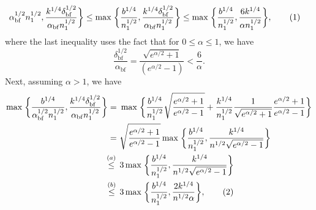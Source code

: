 \documentclass[twoside,11pt]{article}
\newcommand\numberthis{\addtocounter{equation}{1}\tag{\theequation}}
\newcommand{\normSqMultinomMax}{b}
\newcommand{\alphabetSize}{k} %
\newcommand{\sampleSize}{n}
\newcommand{\privacyParameter}{\alpha} %
\newcommand{\privacyParameterrappor}{\privacyParameter_{\mathrm{bf}}}
\newcommand{\smallNumber}{\delta}
\newcommand{\smallNumberrappor}{\smallNumber_{\mathrm{bf}}}
\begin{document}
\begin{appendix}
\begin{align*}
{		}{
			\privacyParameterrappor^{1/2}
			\sampleSize_1^{1/2}}
		,
		\frac{
			\alphabetSize^{1/4}
			\smallNumberrappor^{1/2} 
		}{
			\privacyParameterrappor
			\sampleSize_1^{1/2}}
		\biggr\}
		&\leq
		\max \;
		\biggl\{
		\frac{
			\normSqMultinomMax^{1/4}
		}{
			\sampleSize_1^{1/2}}
		,
		\frac{
			\alphabetSize^{1/4}
			\smallNumberrappor^{1/2} 
		}{
			\privacyParameterrappor
			\sampleSize_1^{1/2}}
		\biggr\}
		\leq
		\max \;
		\biggl\{
		\frac{
			\normSqMultinomMax^{1/4}
		}{
			\sampleSize_1^{1/2}}
		,
		\frac{
			6\alphabetSize^{1/4}
		}{
			\privacyParameter
			\sampleSize_1^{1/2}}
		\biggr\},
		\numberthis
		\label{rappor_final_high_privacy}
	\end{align*}
	where the last inequality uses the fact that for $0 \leq \privacyParameter \leq 1$, we have
	\begin{equation*}
		\frac{\smallNumberrappor^{1/2}}{
			\privacyParameterrappor}
		= 
		\frac{\sqrt{e^{\alpha/2}+1}}{
			(e^{\alpha/2}-1)}
		<
		\frac{6}{\privacyParameter}.
	\end{equation*}
	Next, assuming $ \privacyParameter > 1$, we have
	\begin{align*}
		\max \;
		\biggl\{
		\frac{
			\normSqMultinomMax^{1/4}
		}{
			\privacyParameterrappor^{1/2}
			\sampleSize_1^{1/2}}
		,
		\frac{
			\alphabetSize^{1/4}
			\smallNumberrappor^{1/2} 
		}{
			\privacyParameterrappor
			\sampleSize_1^{1/2}}
		\biggr\}
		= ~&
		\max \;
		\biggl\{
		\frac{b^{1/4}}{\sampleSize_1^{1/2}}\sqrt{\frac{e^{\alpha/2}+1}{e^{\alpha/2}-1}} + \frac{k^{1/4}}{\sampleSize_1^{1/2}}
		\frac{1}{
			\sqrt{
				e^{\alpha/2 }+1
		} }
		\frac{e^{\alpha/2}+1}{e^{\alpha/2}-1}
		\biggr\}
		\\
		= ~&
		\sqrt{\frac{e^{\alpha/2}+1}{e^{\alpha/2}-1}} 
		\max \;
		\biggl\{
		\frac{b^{1/4}}{\sampleSize_1^{1/2}},
		\frac{k^{1/4}}{
			n^{1/2}
			\sqrt{
				e^{\alpha/2 }-1
			}
		}
		\biggr\}
		\\
		\stackrel{(a)}{\leq} \hskip 1.57mm &
		3
		\max \;
		\biggl\{
		\frac{b^{1/4}}{\sampleSize_1^{1/2}},
		\frac{k^{1/4}}{
			n^{1/2}
			\sqrt{
				e^{\alpha/2 }-1
			}
		}
		\biggr\}
		\\
		\stackrel{(b)}{\leq} \hskip 1.57mm &
		3
		\max \;
		\biggl\{
		\frac{b^{1/4}}{\sampleSize_1^{1/2}},
		\frac{2k^{1/4}}{
			n^{1/2}
			\privacyParameter
		}
		\biggr\},
		\numberthis
		\label{rappor_final_low_privacy}

\end{align*}
\end{appendix}
\end{document}
